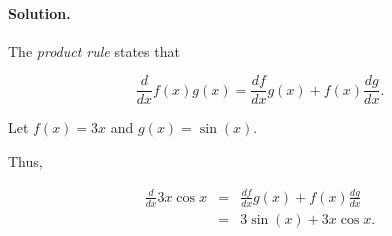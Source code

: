 

\paragraph{Solution.}

The \emph{product rule} states that

\[\frac{d}{dx}f\left(x\right)g\left(x\right)=\frac{df}{dx}g\left(x\right)+f\left(x\right)\frac{dg}{dx}.\]

Let $f\left(x\right)=3x$ and $g\left(x\right)=\sin\left(x\right)$.

Thus,

\begin{eqnarray*}
	\frac{d}{dx}3x\cos x&=&\frac{df}{dx}g\left(x\right)+f\left(x\right)\frac{dg}{dx}\\
	&=&3\sin\left(x\right)+3x\cos x.
\end{eqnarray*}
